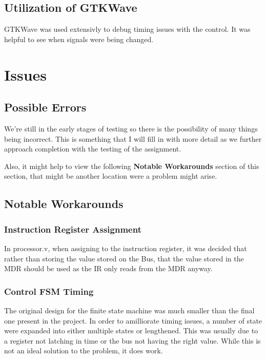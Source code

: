 \documentclass[conference]{IEEEtran}
\begin{document}
\subsection{Utilization of GTKWave}
GTKWave was used extensivly to debug timing issues with the control. It was 
helpful to see when signals were being changed. 




\section{Issues}
\subsection{Possible Errors}
We're still in the early stages of testing so there is the possibility of many things 
being incorrect. This is something that I will fill in with more detail as we 
further approach completion with the testing of the assignment.

Also, it might help to view the following \textbf{Notable Workarounds} section
of this section, that might be another location were a problem might arise.

\subsection{Notable Workarounds}
\subsubsection{Instruction Register Assignment}
In processor.v, when assigning to the instruction register, it was decided 
that rather than storing the value stored on the Bus, that the value stored
in the MDR should be used as the IR only reads from the MDR anyway.
\subsubsection{Control FSM Timing}
The original design for the finite state machine was much smaller than the 
final one present in the project. In order to amilliorate timing issues, a
number of state were expanded into either multiple states or lengthened. This 
was usually due to a register not latching in time or the bus not having the
right value. While this is not an ideal solution to the problem, it does work.


\clearpage 
\end{document}

